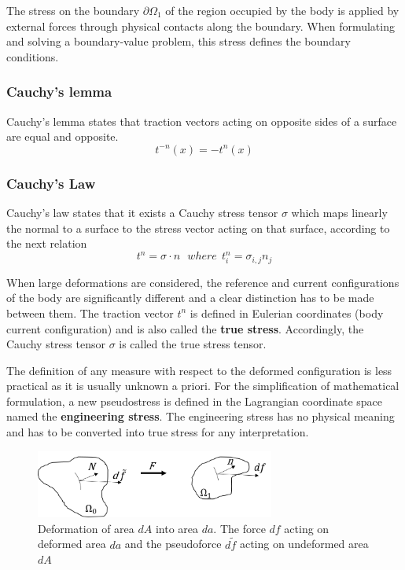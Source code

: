 The stress on the boundary $\partial \Omega_1$ of the region occupied by the body is applied by external forces through physical contacts along the boundary. When formulating and solving a boundary-value problem, this stress defines the boundary conditions.


\subsubsection*{Cauchy's lemma}

Cauchy's lemma states that traction vectors acting on opposite sides of a surface are equal and opposite.
\begin{equation}
t^{-n}(x) = -t^n(x)
\label{chauchyLemma}
\end{equation}
\subsubsection*{Cauchy's Law}
Cauchy’s law states that it exists a Cauchy stress tensor $\sigma$ which maps linearly the normal to a surface to the stress vector acting on that surface, according to the next relation
\begin{equation}
t^n = \sigma \cdot n \ \ \ where \  \ t^n_i = \sigma_{i,j} n_j
\end{equation}

When large deformations are considered, the reference and current configurations of the body are significantly different and a clear distinction has to be made between them. The traction vector $t^n$ is defined in Eulerian coordinates (body current configuration) and is also called the \textbf{true stress}. Accordingly, the Cauchy stress tensor $\sigma$ is called the true stress tensor.

The definition of any measure with respect to the deformed configuration is less practical as it is usually unknown a priori. For the simplification of mathematical formulation, a new pseudostress is defined in the Lagrangian coordinate space named the \textbf{engineering stress}. The engineering stress has no physical meaning and has to be converted into true stress for any interpretation.


\begin{figure}
\begin{center}
\includegraphics[width=0.7\textwidth,keepaspectratio]{figures/stressnotion.png} 
\caption[]{Deformation of area $dA$  into area $da$. The force $df$ acting on deformed area $da$ and the pseudoforce $d\tilde{f}$ acting on undeformed area $dA$}
\label{stressnotion}
\end{center}
\end{figure} 


